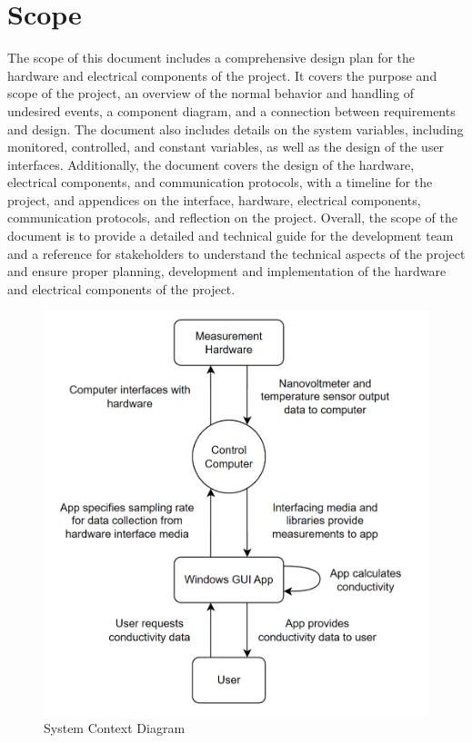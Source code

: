 \documentclass[12pt, titlepage]{article}
\begin{document}
\section{Scope}


\noindent The scope of this document includes a comprehensive design plan for the hardware and electrical components of the project. It covers the purpose and scope of the project, an overview of the normal behavior and handling of undesired events, a component diagram, and a connection between requirements and design. The document also includes details on the system variables, including monitored, controlled, and constant variables, as well as the design of the user interfaces. Additionally, the document covers the design of the hardware, electrical components, and communication protocols, with a timeline for the project, and appendices on the interface, hardware, electrical components, communication protocols, and reflection on the project. Overall, the scope of the document is to provide a detailed and technical guide for the development team and a reference for stakeholders to understand the technical aspects of the project and ensure proper planning, development and implementation of the hardware and electrical components of the project. \\

\begin{figure}[H]
\centerline{\includegraphics[scale=0.6]{ScopeDiagram.png}}
\caption{System Context Diagram}
\label{fig}
\end{figure}
\end{document}
